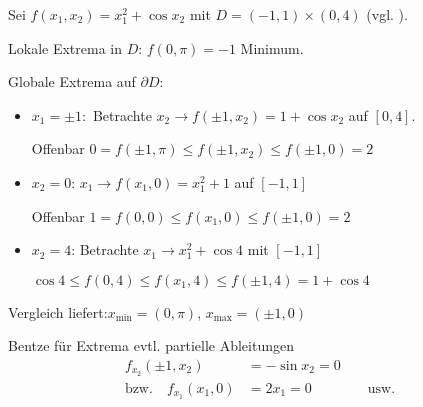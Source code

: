 \begin{example}
	Sei $f(x_1, x_2) = x_1^2 + \cos x_2$ mit $D=(-1,1)\times(0,4)$ (vgl. ).
	
	Lokale Extrema in $D$: $f(0,\pi) = -1$ Minimum.
	
	Globale Extrema auf $\partial D$:\begin{itemize}
		\item $x_1 = \pm 1:$ Betrachte $x_2 \to f(\pm 1, x_2) = 1 + \cos x_2$ auf $[0,4]$.
		
		Offenbar $0 = f(\pm 1, \pi) \le f(\pm 1, x_2) \le f(\pm 1, 0) = 2$
		
		\item $x_2=0$: $x_1\to f(x_1, 0) = x_1^2 + 1$ auf $[-1,1]$
		
		Offenbar $1=f(0,0) \le f(x_1,0)\le f(\pm 1, 0) = 2$
		
		\item $x_2 = 4$: Betrachte $x_1\to x_1^2+\cos 4$ mit $[-1,1]$
		
		$\cos 4 \le f(0,4) \le f(x_1, 4) \le f(\pm 1, 4) = 1 + \cos 4$
	\end{itemize}
	Vergleich liefert:$ x_{\min}=(0,\pi)$, $x_{\max} = (\pm 1,0)$
	
	\begin{underlinedenvironment}[Hinweis]
		Bentze für Extrema evtl. partielle Ableitungen \begin{align*}
			f_{x_2}(\pm 1, x_2) &= -\sin x_2 = 0 \\
			\text{bzw.}\quad f_{x_1}(x_1, 0) &= 2x_1 = 0 \qquad\qquad\text{usw.}
		\end{align*}
	\end{underlinedenvironment}
\end{example}